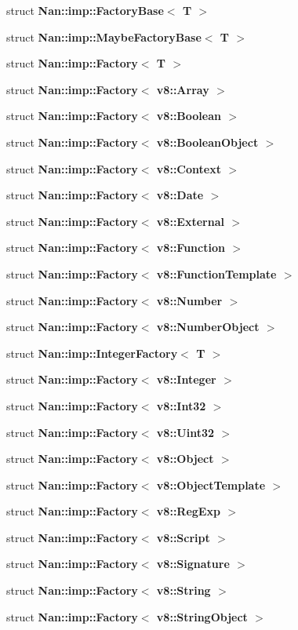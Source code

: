 \begin{DoxyCompactItemize}
struct \textbf{ Nan\+::imp\+::\+Factory\+Base$<$ T $>$}
\item 
struct \textbf{ Nan\+::imp\+::\+Maybe\+Factory\+Base$<$ T $>$}
\item 
struct \textbf{ Nan\+::imp\+::\+Factory$<$ T $>$}
\item 
struct \textbf{ Nan\+::imp\+::\+Factory$<$ v8\+::\+Array $>$}
\item 
struct \textbf{ Nan\+::imp\+::\+Factory$<$ v8\+::\+Boolean $>$}
\item 
struct \textbf{ Nan\+::imp\+::\+Factory$<$ v8\+::\+Boolean\+Object $>$}
\item 
struct \textbf{ Nan\+::imp\+::\+Factory$<$ v8\+::\+Context $>$}
\item 
struct \textbf{ Nan\+::imp\+::\+Factory$<$ v8\+::\+Date $>$}
\item 
struct \textbf{ Nan\+::imp\+::\+Factory$<$ v8\+::\+External $>$}
\item 
struct \textbf{ Nan\+::imp\+::\+Factory$<$ v8\+::\+Function $>$}
\item 
struct \textbf{ Nan\+::imp\+::\+Factory$<$ v8\+::\+Function\+Template $>$}
\item 
struct \textbf{ Nan\+::imp\+::\+Factory$<$ v8\+::\+Number $>$}
\item 
struct \textbf{ Nan\+::imp\+::\+Factory$<$ v8\+::\+Number\+Object $>$}
\item 
struct \textbf{ Nan\+::imp\+::\+Integer\+Factory$<$ T $>$}
\item 
struct \textbf{ Nan\+::imp\+::\+Factory$<$ v8\+::\+Integer $>$}
\item 
struct \textbf{ Nan\+::imp\+::\+Factory$<$ v8\+::\+Int32 $>$}
\item 
struct \textbf{ Nan\+::imp\+::\+Factory$<$ v8\+::\+Uint32 $>$}
\item 
struct \textbf{ Nan\+::imp\+::\+Factory$<$ v8\+::\+Object $>$}
\item 
struct \textbf{ Nan\+::imp\+::\+Factory$<$ v8\+::\+Object\+Template $>$}
\item 
struct \textbf{ Nan\+::imp\+::\+Factory$<$ v8\+::\+Reg\+Exp $>$}
\item 
struct \textbf{ Nan\+::imp\+::\+Factory$<$ v8\+::\+Script $>$}
\item 
struct \textbf{ Nan\+::imp\+::\+Factory$<$ v8\+::\+Signature $>$}
\item 
struct \textbf{ Nan\+::imp\+::\+Factory$<$ v8\+::\+String $>$}
\item 
struct \textbf{ Nan\+::imp\+::\+Factory$<$ v8\+::\+String\+Object $>$}

\end{DoxyCompactItemize}
